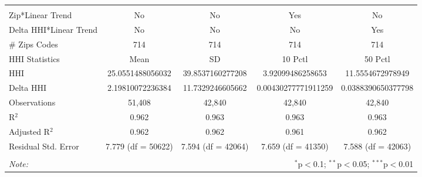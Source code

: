 \begin{table}[H]
{\begin{tabular}{@{\extracolsep{5pt}}lcccc}
 \hline \\[-1.8ex]  

 Zip*Linear Trend & No & No & Yes & No \\  

 Delta HHI*Linear Trend & No & No & No & Yes \\  

 # Zips Codes & 714 & 714 & 714 & 714 \\  

 HHI Statistics & Mean & SD & 10 Pctl & 50 Pctl \\  

 HHI & 25.0551488056032 & 39.8537160277208 & 3.92099486258653 & 11.5554672978949 \\  

 Delta HHI & 2.19810072236384 & 11.7329246605662 & 0.00430277771911259 & 0.0388390650377798 \\  

 Observations & 51,408 & 42,840 & 42,840 & 42,840 \\  

 R$^{2}$ & 0.962 & 0.963 & 0.963 & 0.963 \\  

 Adjusted R$^{2}$ & 0.962 & 0.962 & 0.961 & 0.962 \\  

 Residual Std. Error & 7.779 (df = 50622) & 7.594 (df = 42064) & 7.659 (df = 41350) & 7.588 (df = 42063) \\  

 \hline  

 \hline \\[-1.8ex]  

 \textit{Note:}  & \multicolumn{4}{r}{$^{*}$p$<$0.1; $^{**}$p$<$0.05; $^{***}$p$<$0.01} \\  

 \end{tabular}}  

 \end{table}  

 



